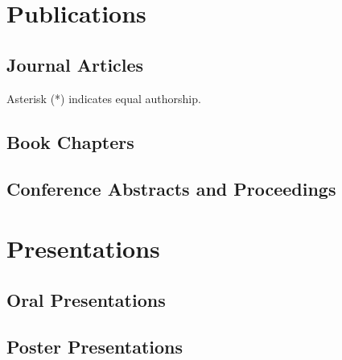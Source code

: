 \documentclass[%
]{komacv}
\begin{document}
\section{Publications}

\subsection{Journal Articles}

{\small Asterisk (*) indicates equal authorship.}

\begin{refcontext}[labelprefix=A]
\nocite{*}
\printbibliography[, keyword=article, heading=none, resetnumbers=true]
\end{refcontext}

\subsection{Book Chapters}

\begin{refcontext}[labelprefix=B]
\nocite{*}
\printbibliography[keyword=book, heading=none, resetnumbers=true]
\end{refcontext}

\subsection{Conference Abstracts and Proceedings}

\begin{refcontext}[labelprefix=C]
\nocite{*}
\printbibliography[keyword=proceeding, heading=none, resetnumbers=true]
\end{refcontext}

\section{Presentations}

\subsection{Oral Presentations}

\begin{refcontext}[labelprefix=O]
\nocite{*}
\printbibliography[keyword=talk, heading=none, resetnumbers=true]
\end{refcontext}

\subsection{Poster Presentations}
\end{document}
